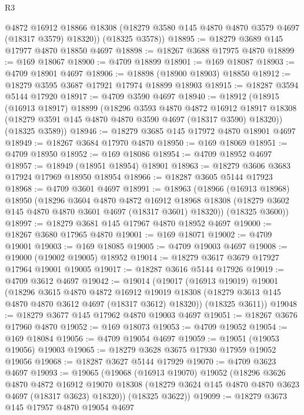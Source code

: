 \begin{lexlean}{R3}
\begin{coremodule}
        @4872
        @16912
        @18866
        @18308
        (@18279 @3580 @145 @4870 @4870 @3579 @4697 (@18317 @3579) @18320))
      (@18325 @3578))
@18895 := @18279 @3689 @145 @17977 @4870 @18850 @4697
@18898 := @18267 @3688 @17975 @4870
@18899 := @169 @18067
@18900 := @4709 @18899
@18901 := @169 @18087
@18903 := @4709 @18901 @4697
@18906 := @18898 (@18900 @18903) @18850
@18912 := @18279 @3595 @3687 @17921 @17974 @18899 @18903
@18915 := @18287 @3594 @5144 @17920
@18917 := @4709 @3590 @4697
@18940 := @18912
    (@18915
      (@16913 @18917)
      @18899
      (@18296
        @3593
        @4870
        @4872
        @16912
        @18917
        @18308
        (@18279 @3591 @145 @4870 @4870 @3590 @4697 (@18317 @3590) @18320))
      (@18325 @3589))
@18946 := @18279 @3685 @145 @17972 @4870 @18901 @4697
@18949 := @18267 @3684 @17970 @4870
@18950 := @169 @18069
@18951 := @4709 @18950
@18952 := @169 @18086
@18954 := @4709 @18952 @4697
@18957 := @18949 (@18951 @18954) @18901
@18963 := @18279 @3606 @3683 @17924 @17969 @18950 @18954
@18966 := @18287 @3605 @5144 @17923
@18968 := @4709 @3601 @4697
@18991 := @18963
    (@18966
      (@16913 @18968)
      @18950
      (@18296
        @3604
        @4870
        @4872
        @16912
        @18968
        @18308
        (@18279 @3602 @145 @4870 @4870 @3601 @4697 (@18317 @3601) @18320))
      (@18325 @3600))
@18997 := @18279 @3681 @145 @17967 @4870 @18952 @4697
@19000 := @18267 @3680 @17965 @4870
@19001 := @169 @18071
@19002 := @4709 @19001
@19003 := @169 @18085
@19005 := @4709 @19003 @4697
@19008 := @19000 (@19002 @19005) @18952
@19014 := @18279 @3617 @3679 @17927 @17964 @19001 @19005
@19017 := @18287 @3616 @5144 @17926
@19019 := @4709 @3612 @4697
@19042 := @19014
    (@19017
      (@16913 @19019)
      @19001
      (@18296
        @3615
        @4870
        @4872
        @16912
        @19019
        @18308
        (@18279 @3613 @145 @4870 @4870 @3612 @4697 (@18317 @3612) @18320))
      (@18325 @3611))
@19048 := @18279 @3677 @145 @17962 @4870 @19003 @4697
@19051 := @18267 @3676 @17960 @4870
@19052 := @169 @18073
@19053 := @4709 @19052
@19054 := @169 @18084
@19056 := @4709 @19054 @4697
@19059 := @19051 (@19053 @19056) @19003
@19065 := @18279 @3628 @3675 @17930 @17959 @19052 @19056
@19068 := @18287 @3627 @5144 @17929
@19070 := @4709 @3623 @4697
@19093 := @19065
    (@19068
      (@16913 @19070)
      @19052
      (@18296
        @3626
        @4870
        @4872
        @16912
        @19070
        @18308
        (@18279 @3624 @145 @4870 @4870 @3623 @4697 (@18317 @3623) @18320))
      (@18325 @3622))
@19099 := @18279 @3673 @145 @17957 @4870 @19054 @4697

\end{coremodule}
\end{lexlean}
